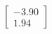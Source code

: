 \documentclass[preview]{standalone}
\begin{document}
\begin{align*}
\begin{bmatrix} -3.90 \\ 1.94 \end{bmatrix}
\end{align*}
\end{document}
